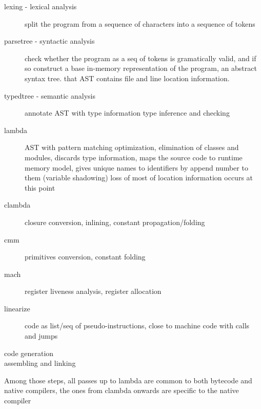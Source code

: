\begin{description}
    \item[lexing - lexical analysis]
        split the program from a sequence of characters into a sequence of tokens

    \item[parsetree - syntactic analysis]

        check whether the program as a seq of tokens is gramatically valid, and if so
        construct a base in-memory representation of the program, an abstract syntax
        tree. that AST contains file and line location information.

    \item[typedtree - semantic analysis]
        annotate AST with type information
        type inference and checking

    \item[lambda]
        AST with
        pattern matching optimization,
        elimination of classes and modules,
        discards type information,
        maps the source code to runtime memory model,
        gives unique names to identifiers by append number to them
        (variable shadowing)
        loss of most of location information occurs at this point

    \item[clambda]
        closure conversion, inlining, constant propagation/folding

    \item[cmm]
        primitives conversion, constant folding

    \item[mach]
        register liveness analysis, register allocation

    \item[linearize]
        code as list/seq of pseudo-instructions, close to machine code
        with calls and jumps

    \item[code generation]

    \item[assembling and linking]
\end{description}

Among those steps, all passes up to lambda are common to both bytecode and
native compilers, the ones from clambda onwards are specific to the native compiler



